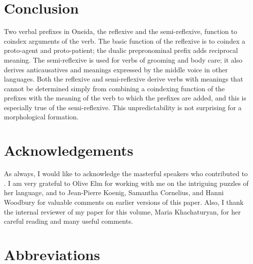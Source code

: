 \documentclass[output=paper]{langscibook}
\begin{document}
\section{Conclusion}\label{sec:oneida:6}

Two verbal prefixes in Oneida, the reflexive and the semi-reflexive, function to coindex arguments of the verb. The basic function of the reflexive is to coindex a proto-agent and proto-patient; the dualic prepronominal prefix adds reciprocal meaning. The semi-reflexive is used for verbs of grooming and body care; it also derives anticausatives and meanings expressed by the middle voice in other languages. Both the reflexive and semi-reflexive derive verbs with meanings that cannot be determined simply from combining a coindexing function of the prefixes with the meaning of the verb to which the prefixes are added, and this is especially true of the semi-reflexive. This unpredictability is not surprising for a morphological for\-mation.

\section*{Acknowledgements}

As always, I would like to acknowledge the masterful speakers who contributed to \citet{MichelsonKennedyDoxtator2016}. I am very grateful to Olive Elm for working with me on the intriguing puzzles of her language, and to Jean-Pierre Koenig, Samantha Cornelius, and Hanni Woodbury for valuable comments on earlier versions of this paper. Also, I thank the internal reviewer of my paper for this volume, Maria Khachaturyan, for her careful reading and many useful comments.



    
\section*{Abbreviations}
\end{document}
